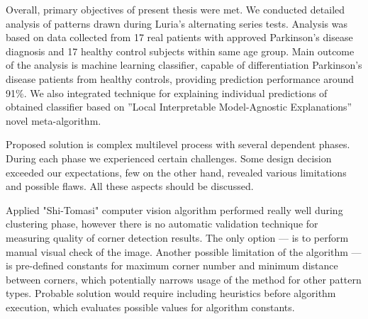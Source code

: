 
Overall, primary objectives of present thesis were met. We conducted detailed analysis of patterns drawn during Luria's alternating series tests. Analysis was based on data collected from 17 real patients with approved Parkinson's disease diagnosis and 17 healthy control subjects within same age group. Main outcome of the analysis is machine learning classifier, capable of differentiation Parkinson’s disease patients from healthy controls, providing prediction performance around 91\%. We also integrated technique for explaining individual predictions of obtained classifier based on ”Local Interpretable Model-Agnostic Explanations” novel meta-algorithm. 

Proposed solution is complex multilevel process with several dependent phases. During each phase we experienced certain challenges. Some design decision exceeded our expectations, few on the other hand, revealed various limitations and possible flaws. All these aspects should be discussed. 


Applied "Shi-Tomasi" computer vision algorithm \cite{shi1994good} performed really well during clustering phase, however there is no automatic validation technique for measuring quality of corner detection results. The only option --- is to perform manual visual check of the image. Another possible limitation of the algorithm --- is pre-defined constants for maximum corner number and minimum distance between corners, which potentially narrows usage of the method for other pattern types. Probable solution would require including heuristics before algorithm execution, which evaluates possible values for algorithm constants.


